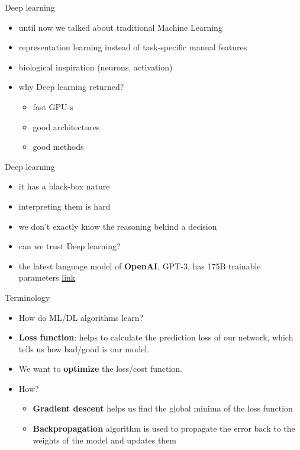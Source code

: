 \documentclass[bigger]{beamer}
\begin{document}
\begin{frame}{Deep learning}
    \begin{itemize}
    	\item until now we talked about traditional Machine Learning
        \item representation learning instead of task-specific manual features
        \item biological inspiration (neurons, activation)
        \item why Deep learning returned?
        \begin{itemize}
        	\item fast GPU-s
        	\item good architectures
        	\item good methods
        \end{itemize}
    \end{itemize}
\end{frame}

\begin{frame}{Deep learning}
    \begin{itemize}
    	\item it has a black-box nature
        \item interpreting them is hard
        \item we don't exactly know the reasoning behind a decision
        \item can we trust Deep learning?
        \item the latest language model of \textbf{OpenAI}, GPT-3, has 175B trainable parameters \href{https://news.developer.nvidia.com/openai-presents-gpt-3-a-175-billion-parameters-language-model/}{link}
    \end{itemize}
\end{frame}

\begin{frame}{Terminology}
    \begin{itemize}
        \item How do ML/DL algorithms learn?
        \item \textbf{Loss function}:  helps to calculate the prediction loss of our network, which tells us how bad/good is our model.
        \item We want to \textbf{optimize} the loss/cost function.
        \item How?
            \begin{itemize}
                \item \textbf{Gradient descent} helps us find the global minima of the loss function
                \item \textbf{Backpropagation} algorithm is used to propagate the error back to the weights of the model and updates them
            \end{itemize}
    \end{itemize}   
\end{frame}
\end{document}
